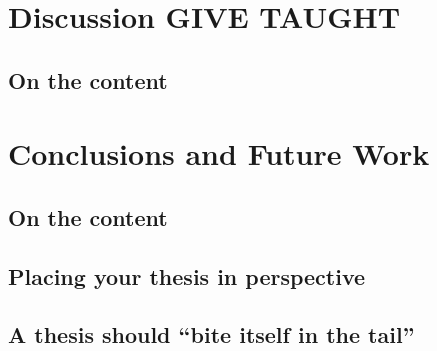 
\chapter{Discussion GIVE TAUGHT}
\label{chp:discussion}
\section{On the content}


\chapter{Conclusions and Future Work}
\label{chp:conclusions}
\section{On the content}


\section{Placing your thesis in perspective}

    
\section{A thesis should ``bite itself in the tail''}
